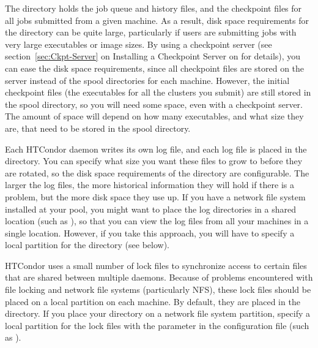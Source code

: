 \begin{description}
\begin{description}
\item[\File{spool}] The  directory holds the job queue
and history files,
and the checkpoint files for all jobs submitted from a given machine.
As a result, disk space requirements for the  directory
can be quite large,
particularly if users are submitting jobs with very large
executables or image sizes.
By using a checkpoint server
(see section~\ref{sec:Ckpt-Server} on Installing a Checkpoint Server on
for details),
you can ease the disk
space requirements, since all checkpoint files are stored on the
server instead of the spool directories for each machine.  However,
the initial checkpoint files (the executables for all the clusters you
submit) are still stored in the spool directory, so you will need
%
%
some space, even with a checkpoint server. The amount of space will 
depend on how many executables, and what size they are, that need to be stored
in the spool directory.

\item[\File{log}] Each HTCondor daemon writes its own log file,
and each log file is placed
in the  directory.  You can specify what size you want these files
to grow to before they are rotated,
%
%
so the disk space requirements of
the directory are configurable.
The larger the log files, the more
historical information they will hold if there is a problem, but the
more disk space they use up.  If you have a network file system
installed at your pool, you might want to place the log directories in
a shared location (such as ),
so that you can view the log files from all your machines in a single
location.  However, if you take this approach, you will have to
specify a local partition for the  directory (see below).

\item[\File{lock}] HTCondor uses a small number of lock files to synchronize
access to certain files that are shared between multiple daemons.
Because of problems encountered with file locking and network
file systems (particularly NFS), these lock files should be placed on a
local partition on each machine.  By default, they are placed in
the  directory.  If you place your 
directory on a network file system partition,
specify a local partition for the
lock files with the  parameter in the configuration file (such as
).


\end{description}
\end{description}
